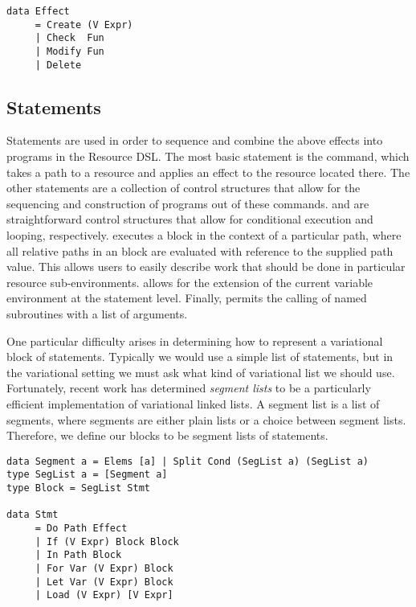 \documentclass[12pt,oneside]{book}
\begin{document}
\begin{minipage}{\linewidth}
\begin{lstlisting}
data Effect
     = Create (V Expr)
     | Check  Fun
     | Modify Fun
     | Delete
\end{lstlisting}
\end{minipage}

\subsection{Statements}

Statements are used in order to sequence and combine the above effects into programs in the Resource DSL.
The most basic statement is the  command, which takes a path to a resource and applies an effect to the resource located there.
The other statements are a collection of control structures that allow for the sequencing and construction of
programs out of these  commands.  and  are straightforward control structures that allow
for conditional execution and looping, respectively.  executes a block in the context of a particular path, where all
relative paths in an  block are evaluated with reference to the supplied path value. This allows
users to easily describe work that should be done in particular resource sub-environments.  allows for the
extension of the current variable environment at the statement level. Finally,  permits the calling of named
subroutines with a list of arguments. 

One particular difficulty arises in determining how to represent a variational block of statements. Typically we
would use a simple list of statements, but in the variational setting we must ask what kind of variational list
we should use. Fortunately, recent work \cite{lists} has determined \emph{segment lists} to be a particularly
efficient implementation of variational linked lists. A segment list is a list of segments, where segments are either
plain lists or a choice between segment lists. Therefore, we define our blocks to be segment lists of
statements.

\begin{minipage}{\linewidth}
\begin{lstlisting}
data Segment a = Elems [a] | Split Cond (SegList a) (SegList a)
type SegList a = [Segment a]
type Block = SegList Stmt

data Stmt
     = Do Path Effect
     | If (V Expr) Block Block
     | In Path Block
     | For Var (V Expr) Block
     | Let Var (V Expr) Block
     | Load (V Expr) [V Expr]
\end{lstlisting}
\end{minipage}
\end{document}
